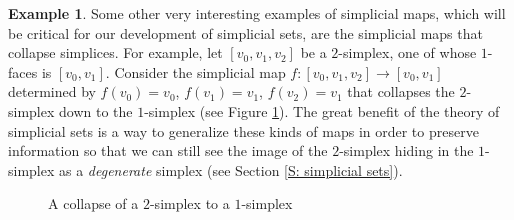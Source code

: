 \documentclass[12pt]{article}
\theoremstyle{plain}
\theoremstyle{definition}
\newtheorem{example}[theorem]{Example}
\begin{document}
\begin{example}\label{E: collapse}
Some other  very interesting examples of simplicial maps, which will be critical for our development of  simplicial sets, are the simplicial maps that collapse simplices. For example, let $[v_0,v_1,v_2]$ be a $2$-simplex, one of whose $1$-faces is $[v_0,v_1]$.
Consider the simplicial map $f\colon [v_0,v_1,v_2]\to [v_0,v_1]$ determined by $f(v_0)=v_0$, $f(v_1)=v_1$, $f(v_2)=v_1$ that collapses the $2$-simplex down to the $1$-simplex (see Figure \ref{F: fig4}). The great benefit of the theory of simplicial sets is a way to generalize these kinds of maps in order to preserve information so that we can still see the image of the $2$-simplex hiding in the $1$-simplex as a \emph{degenerate} simplex (see Section \ref{S: simplicial sets}).
\end{example}


\begin{figure}[!htp]
\begin{center}
\end{center}
\caption{A collapse of a $2$-simplex to a $1$-simplex}\label{F: fig4}
\end{figure}
\end{document}
